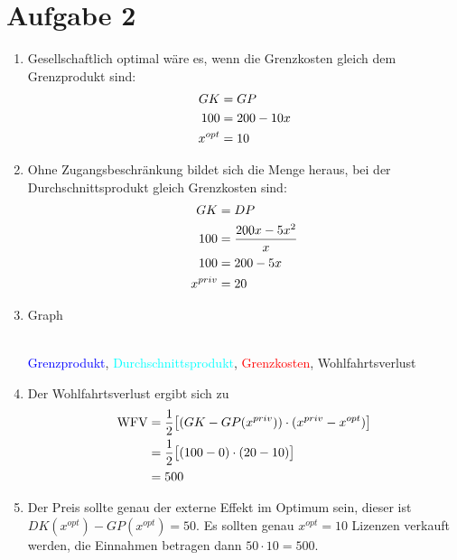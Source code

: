 \documentclass{article}
\begin{document}
	\section*{Aufgabe 2}
	\begin{enumerate}[label=(\alph*)]
		\item Gesellschaftlich optimal wäre es, wenn die Grenzkosten gleich dem Grenzprodukt sind:
		\begin{align}
			GK &= GP \notag \\
			100 &= 200-10x \notag \\
			x^{opt} &= 10 \notag
		\end{align}
		\item Ohne Zugangsbeschränkung bildet sich die Menge heraus, bei der Durchschnittsprodukt gleich Grenzkosten sind:
		\begin{align}
			GK &= DP \notag \\
			100 &= \frac{200x-5x^2}{x} \notag \\
			100 &= 200 - 5x \notag \\
			x^{priv} &= 20 \notag
		\end{align}
		\item Graph
		\begin{center}
			 \\
			\textcolor{blue}{Grenzprodukt}, \textcolor{cyan}{Durchschnittsprodukt}, \textcolor{red}{Grenzkosten}, \textcolor{green!80!black}{Wohlfahrtsverlust}
		\end{center}
		\item Der Wohlfahrtsverlust ergibt sich zu
		\begin{align}
			\text{WFV} &= \frac{1}{2}\big[(GK - GP(x^{priv}))\cdot (x^{priv} - x^{opt})\big] \notag \\
			&= \frac{1}{2} \big[(100-0) \cdot (20-10)\big] \notag \\
			&= 500 \notag
		\end{align}
		\item Der Preis sollte genau der externe Effekt im Optimum sein, dieser ist $DK(x^{opt}) - GP(x^{opt}) = 50$. Es sollten genau $x^{opt}=10$ Lizenzen verkauft werden, die Einnahmen betragen dann $50\cdot 10=500$.
	\end{enumerate}
\end{document}
